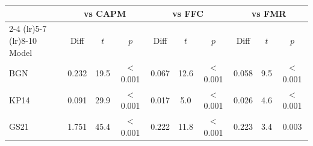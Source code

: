 \begin{tabular}{l c c c c c c c c c}
\toprule
& \multicolumn{3}{c}{vs CAPM} & \multicolumn{3}{c}{vs FFC} & \multicolumn{3}{c}{vs FMR} \\
\cmidrule(lr){2-4} \cmidrule(lr){5-7} \cmidrule(lr){8-10}
Model & Diff & $t$ & $p$ & Diff & $t$ & $p$ & Diff & $t$ & $p$ \\
\midrule
BGN & 0.232 & 19.5 & $<$0.001 & 0.067 & 12.6 & $<$0.001 & 0.058 & 9.5 & $<$0.001 \\
KP14 & 0.091 & 29.9 & $<$0.001 & 0.017 & 5.0 & $<$0.001 & 0.026 & 4.6 & $<$0.001 \\
GS21 & 1.751 & 45.4 & $<$0.001 & 0.222 & 11.8 & $<$0.001 & 0.223 & 3.4 & 0.003 \\
\bottomrule
\end{tabular}
